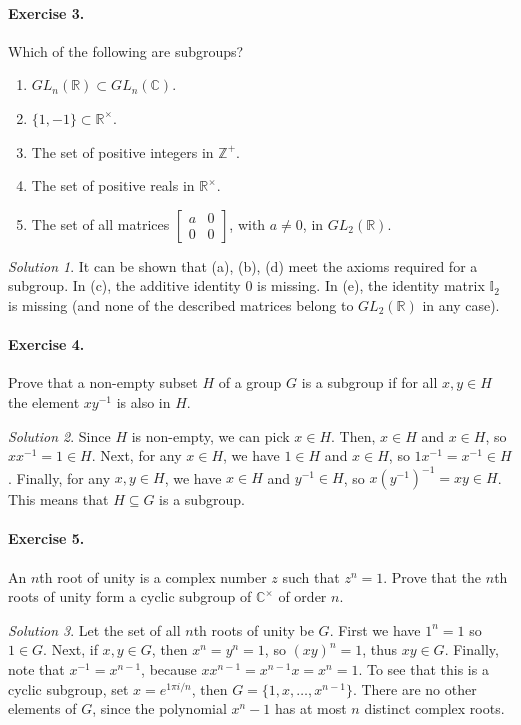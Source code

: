 \documentclass[11pt]{report}
\def\C{\mathbb{C}}
\def\R{\mathbb{R}}
\def\Z{\mathbb{Z}}
\theoremstyle{remark}
\newtheorem*{solution}{Solution}
\begin{document}
    \paragraph{Exercise 3.} Which of the following are subgroups?
    \begin{enumerate}
        \itemsep0em
        \item $GL_n(\R) \subset GL_n(\C)$.
        \item $\{1, -1\} \subset \R^\times$.
        \item The set of positive integers in $\Z^+$.
        \item The set of positive reals in $\R^\times$.
        \item The set of all matrices $\begin{bmatrix}
            a & 0 \\ 0 & 0
        \end{bmatrix}$, with $a \neq 0$, in $GL_2(\R)$.
    \end{enumerate}
    \begin{solution}
        It can be shown that (a), (b), (d) meet the axioms required for a subgroup.
        In (c), the additive identity $0$ is missing. In (e), the identity matrix
        $\mathbb{I}_2$ is missing (and none of the described matrices belong to
        $GL_2(\R)$ in any case).
    \end{solution}

    \paragraph{Exercise 4.} Prove that a non-empty subset $H$ of a group $G$ is a
    subgroup if for all $x, y \in H$ the element $xy^{-1}$ is also in $H$.
    \begin{solution}
        Since $H$ is non-empty, we can pick $x \in H$. Then, $x \in H$ and $x \in
        H$, so $x x^{-1} = 1 \in H$. Next, for any $x \in H$, we have $1 \in H$ and 
        $x \in H$, so $1x^{-1} = x^{-1} \in H$. Finally, for any $x, y \in H$, we
        have $x \in H$ and $y^{-1} \in H$, so $x(y^{-1})^{-1} = xy \in H$. This
        means that $H \subseteq G$ is a subgroup.
    \end{solution}
    
    \paragraph{Exercise 5.} An $n$th root of unity is a complex number $z$ such that
    $z^n = 1$. Prove that the $n$th roots of unity form a cyclic subgroup of
    $\C^\times$ of order $n$.
    \begin{solution}
        Let the set of all $n$th roots of unity be $G$.
        First we have $1^n = 1$ so $1 \in G$. Next, if $x, y \in G$, then $x^n = y^n
        = 1$, so $(xy)^n = 1$, thus $xy \in G$. Finally, note that $x^{-1} = x^{n -
        1}$, because $x x^{n - 1} = x^{n - 1}x = x^n = 1$. To see that this is a
        cyclic subgroup, set $x = e^{1\pi i / n}$, then $G = \{1, x, \dots, x^{n -
        1}\}$. There are no other elements of $G$, since the polynomial $x^n - 1$
        has at most $n$ distinct complex roots.
    \end{solution}
\end{document}
